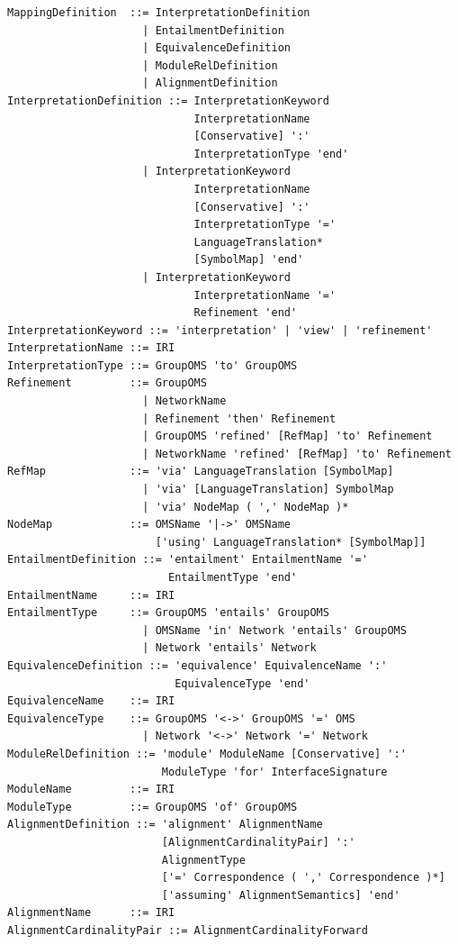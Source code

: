 \documentclass[10pt,fleqn,final]{scrreprt}
\newenvironment{definitions}[0]{\medskip }{}
\begin{document}
\begin{definitions}
\begin{lstlisting}[language=ebnf,mathescape]
MappingDefinition  ::= InterpretationDefinition
                     | EntailmentDefinition
                     | EquivalenceDefinition
                     | ModuleRelDefinition
                     | AlignmentDefinition
InterpretationDefinition ::= InterpretationKeyword
                             InterpretationName
                             [Conservative] ':'
                             InterpretationType 'end'
                     | InterpretationKeyword
                             InterpretationName
                             [Conservative] ':'
                             InterpretationType '='
                             LanguageTranslation*
                             [SymbolMap] 'end'
                     | InterpretationKeyword
                             InterpretationName '='
                             Refinement 'end'
InterpretationKeyword ::= 'interpretation' | 'view' | 'refinement'
InterpretationName ::= IRI
InterpretationType ::= GroupOMS 'to' GroupOMS
Refinement         ::= GroupOMS
                     | NetworkName
                     | Refinement 'then' Refinement
                     | GroupOMS 'refined' [RefMap] 'to' Refinement
                     | NetworkName 'refined' [RefMap] 'to' Refinement
RefMap             ::= 'via' LanguageTranslation [SymbolMap]
                     | 'via' [LanguageTranslation] SymbolMap
                     | 'via' NodeMap ( ',' NodeMap )*
NodeMap            ::= OMSName '|->' OMSName
                       ['using' LanguageTranslation* [SymbolMap]]
EntailmentDefinition ::= 'entailment' EntailmentName '='
                         EntailmentType 'end'
EntailmentName     ::= IRI
EntailmentType     ::= GroupOMS 'entails' GroupOMS
                     | OMSName 'in' Network 'entails' GroupOMS
                     | Network 'entails' Network
EquivalenceDefinition ::= 'equivalence' EquivalenceName ':'
                          EquivalenceType 'end'
EquivalenceName    ::= IRI
EquivalenceType    ::= GroupOMS '<->' GroupOMS '=' OMS
                     | Network '<->' Network '=' Network
ModuleRelDefinition ::= 'module' ModuleName [Conservative] ':'
                        ModuleType 'for' InterfaceSignature
ModuleName         ::= IRI
ModuleType         ::= GroupOMS 'of' GroupOMS
AlignmentDefinition ::= 'alignment' AlignmentName
                        [AlignmentCardinalityPair] ':'
                        AlignmentType
                        ['=' Correspondence ( ',' Correspondence )*]
                        ['assuming' AlignmentSemantics] 'end'
AlignmentName      ::= IRI
AlignmentCardinalityPair ::= AlignmentCardinalityForward

\end{lstlisting}
\end{definitions}
\end{document}
